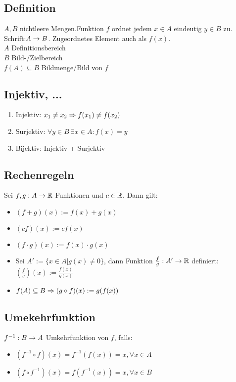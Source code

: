 \subsection*{Definition}
$A, B$ nichtleere Mengen.Funktion $f$ ordnet jedem $x \in A$ eindeutig $y \in B$ zu. Schrift:$A \rightarrow B$. Zugeordnetes Element auch als $f(x)$.\\
$A$ Definitionsbereich\\
$B$ Bild-/Zielbereich\\
$f(A) \subseteq B$ Bildmenge/Bild von $f$
\subsection*{Injektiv, ...}
\begin{enumerate}[label=\arabic*., noitemsep]
    \item Injektiv: $x_1 \neq x_2 \Rightarrow f(x_1) \neq f(x_2)$
    \item Surjektiv: $\forall y \in B \ \exists x \in A: f(x) = y$
    \item Bijektiv: Injektiv + Surjektiv
\end{enumerate}

\subsection*{Rechenregeln}
Sei $f, g: A \rightarrow \mathbb R$ Funktionen und $c \in \mathbb R$. Dann gilt:
\begin{itemize}[noitemsep]
    \item $(f + g)(x) := f(x) + g(x)$
    \item $(cf)(x) := c f(x)$
    \item $(f \cdot g)(x) := f(x) \cdot g(x)$
    \item Sei $A':=\{x \in A| g(x) \neq 0\}$, dann Funktion $\frac{f}{g}: A' \rightarrow \mathbb R$ definiert: $\left(\frac{f}{g}\right)(x) := \frac{f(x)}{g(x)}$
    \item $f(A) \subseteq B \Rightarrow (g \circ f)(x) := g(f(x))$
\end{itemize}
\subsection*{Umekehrfunktion}
$f^{-1}: B \rightarrow A$ Umkehrfunktion von $f$, falls:
\begin{itemize}[leftmargin=*, noitemsep]
    \item $(f^{-1} \circ f) (x) = f^{-1}(f(x)) = x, \forall x \in A$
    \item $(f \circ f^{-1})(x) = f(f^{-1}(x)) = x, \forall x \in B$
\end{itemize}
